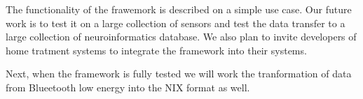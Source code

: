 \documentclass[conference]{IEEEconf}
\begin{document}
The functionality of the frawemork is described on a simple use case. Our future work is to test it on a large collection of sensors and test the data transfer to a large collection of neuroinformatics database. We also plan to invite developers of home tratment systems to integrate the framework into their systems. 

Next, when the framework is fully tested we will work the tranformation of data from Blueetooth low energy into the NIX format as well. 






\end{document}
